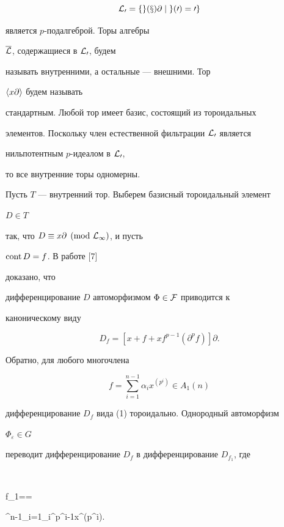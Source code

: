 $$


\cal L_0=\{g(x)\partial\mid g(0)=0\}


$$


является $p$-подалгеброй. Торы алгебры


$\overline{\cal L}$, содержащиеся в $\cal L_0$, будем


называть внутренними, а остальные --- внешними. Тор


$\langle x\partial\rangle$ будем называть


стандартным. Любой тор имеет базис, состоящий из тороидальных


элементов. Поскольку член естественной фильтрации $\cal L_0$ является


нильпотентным $p$-идеалом в $\cal L_0$,


то все внутренние торы одномерны.





Пусть $T$ --- внутренний тор. Выберем базисный тороидальный элемент


$D\in T$


так, что $D\equiv\linebreak x\partial\pmod{\cal L_1}$, и пусть


$\operatorname{cont} D=f$. В работе [7]


доказано, что


дифференцирование $D$ автоморфизмом $\Phi\in\cal F$ приводится к


каноническому виду


\begin{equation}


D_f=[x+f+xf^{p-1}(\partial^pf)]\partial.


\end{equation}


Обратно, для любого многочлена


$$


f=\sum^{n-1}_{i=1}\alpha_ix^{(p^i)}\in A_1(n)


$$


дифференцирование $D_f$ вида (1) тороидально. Однородный автоморфизм


$\Phi_\varepsilon\in G$


переводит дифференцирование $D_f$ в дифференцирование $D_{f_1}$, где


$$


f_1==


\sum^{n-1}_{i=1}\alpha_i\varepsilon^{p^i-1}x^{(p^i)}.


